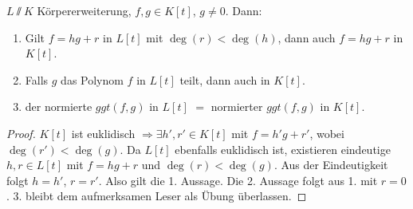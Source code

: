 \documentclass[12pt,a4paper]{scrartcl}
\begin{document}
\begin{satz}
	$L\sslash K$ Körpererweiterung, $f,g\in K[t]$, $g\neq 0$. Dann:
	\begin{enumerate}
		\item Gilt $f = hg+r$ in $L[t]$ mit $\deg(r)<\deg(h)$, dann auch $f = hg+r$ in $K[t]$.
		\item Falls $g$ das Polynom $f$ in $L[t]$ teilt, dann auch in $K[t]$.
		\item der normierte $ggt(f,g)$ in $L[t]$ $= $ normierter $ggt(f,g)$ in $K[t]$.
	\end{enumerate}
\end{satz}
\begin{proof}
	$K[t]$ ist euklidisch $\Rightarrow \exists h', r'\in K[t]$ mit $f = h'g+r'$, wobei $\deg(r')<\deg(g)$. Da $L[t]$ ebenfalls euklidisch ist, existieren eindeutige $h, r\in L[t]$ mit $f = hg+r$ und $\deg(r) <\deg(g)$. Aus der Eindeutigkeit folgt $h = h'$, $r = r'$. Also gilt die 1. Aussage. Die 2. Aussage folgt aus 1. mit $r = 0$. 3. bleibt dem aufmerksamen Leser als Übung überlassen.
\end{proof}
\end{document}
